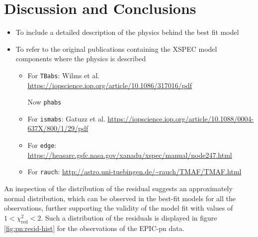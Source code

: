 \section{Discussion and Conclusions}
	
	\begin{itemize}
		\item To include a detailed description of the physics behind the best fit model
		\item To refer to the original publications containing the XSPEC model components where the physics is described
		\begin{itemize}
			\item For \texttt{TBabs}: Wilms et al. \url{https://iopscience.iop.org/article/10.1086/317016/pdf}
			
			Now \texttt{phabs}
			\item For \texttt{ismabs}: Gatuzz et al. \url{https://iopscience.iop.org/article/10.1088/0004-637X/800/1/29/pdf}
			\item For \texttt{edge}: \url{https://heasarc.gsfc.nasa.gov/xanadu/xspec/manual/node247.html}
			\item For \texttt{rauch}: \url{http://astro.uni-tuebingen.de/~rauch/TMAF/TMAF.html}
		\end{itemize}
	\end{itemize}
	An inspection of the distribution of the residual suggests an approximately normal distribution, which can be observed in the best-fit models for all the observations, further supporting the validity of the model fit with values of $1<\chi^2_\text{red}<2$. Such a distribution of the residuals is displayed in figure \ref{fig:pn:resid-hist} for the observations of the EPIC-pn data.
	
